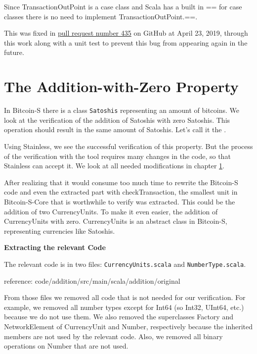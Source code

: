 \documentclass[runningheads]{llncs}
\renewcommand{\paragraph}{\textbf}%
\begin{document}
Since TransactionOutPoint is a case class and Scala has a built in ==
for case classes there is no need to implement TransactionOutPoint.==.

This was fixed in
\href{https://github.com/bitcoin-s/bitcoin-s/pull/435}{pull request
  number 435} on GitHub at April 23, 2019, through this work along
with a unit test to prevent this bug from appearing again in the
future.


\section{The Addition-with-Zero Property}

\label{chap:verify_add}

In Bitcoin-S there is a class \texttt{Satoshis} representing an amount of bitcoins.
We look at the verification of the addition of Satoshis with zero Satoshis.
This operation should result in the same amount of Satoshis.
Let's call it the .

Using Stainless, we see the successful verification of this property.
But the process of the verification with the tool requires many
changes in the code, so that Stainless can accept it.  We look at all
needed modifications in chapter \ref{chap:verify_add}.



After realizing that it would consume too much time to rewrite the
Bitcoin-S code and even the extracted part with checkTransaction, the
smallest unit in Bitcoin-S-Core that is worthwhile to verify was
extracted.  This could be the addition of two CurrencyUnits.  To make
it even easier, the addition of CurrencyUnits with zero.
CurrencyUnits is an abstract class in Bitcoin-S, representing
currencies like Satoshis.

\paragraph{Extracting the relevant Code}

The relevant code is in two files: \texttt{CurrencyUnits.scala} and \texttt{NumberType.scala}.

reference: code/addition/src/main/scala/addition/original

From those files we removed all code that is not needed for our
verification. For example, we removed all number types except for
Int64 (so Int32, UInt64, etc.) because we do not use them. We also
removed the superclasses Factory and NetworkElement of CurrencyUnit
and Number, respectively because the inherited members are not used by
the relevant code. Also, we removed all binary operations on Number that are not used.
\end{document}
